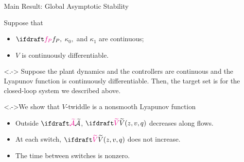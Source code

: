 \documentclass[notheorems, aspectratio=169, presentation]{beamer}
\newcommand{\calAXdef}{\calA \times \{0\} \times \{0, 1\}}
\newcommand{\itemnote}[1]{\note[item]<.->{#1}}
\begin{document}
\begin{frame}[t]{Main Result: Global Asymptotic Stability}
  \begin{theorem}
      Suppose that  
      \begin{itemize}[<+->]
        \item $\fp,$ $\kappa_0,$ and $\kappa_1$ are continuous;
        \item $V$ is continuously differentiable.
    \end{itemize} 
    
    \label{the:UGAS}
  \end{theorem}
  \note<.->{
    Suppose the plant dynamics and the controllers are continuous 
    and the Lyapunov function is continuously differentiable. Then, 
    the target set is \UGAS for the closed-loop system we described above.
  }
  \vspace{-8pt}

  \itemnote{We show that $V$-twiddle is a nonsmooth Lyapunov function}
  
\begin{itemize}[<+->]
  \item Outside $\calAX$, $\tV{(z, v, q)}$ 
    decreases along flows.
    \item At each switch, $\tV{(z, v, q)}$ does not increase.
    \item The time between switches is nonzero.
\end{itemize}


\end{frame}
\end{document}
